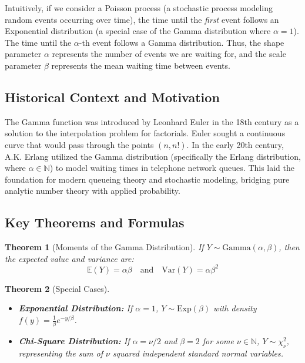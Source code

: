 \documentclass[11pt, a4paper]{article}
\newtheorem{theorem}{Theorem}[section]
\theoremstyle{definition}
\theoremstyle{remark}
\newcommand{\N}{\mathbb{N}}
\newcommand{\E}{\mathbb{E}}
\begin{document}
Intuitively, if we consider a Poisson process (a stochastic process modeling random events occurring over time), the time until the \textit{first} event follows an Exponential distribution (a special case of the Gamma distribution where $\alpha = 1$). The time until the $\alpha$-th event follows a Gamma distribution. Thus, the shape parameter $\alpha$ represents the number of events we are waiting for, and the scale parameter $\beta$ represents the mean waiting time between events.

\subsection{Historical Context and Motivation}
The Gamma function was introduced by Leonhard Euler in the 18th century as a solution to the interpolation problem for factorials. Euler sought a continuous curve that would pass through the points $(n, n!)$. In the early 20th century, A.K. Erlang utilized the Gamma distribution (specifically the Erlang distribution, where $\alpha \in \N$) to model waiting times in telephone network queues. This laid the foundation for modern queueing theory and stochastic modeling, bridging pure analytic number theory with applied probability.

\subsection{Key Theorems and Formulas}
\begin{theorem}[Moments of the Gamma Distribution]
If $Y \sim \text{Gamma}(\alpha, \beta)$, then the expected value and variance are:
\[ \E(Y) = \alpha\beta \quad \text{and} \quad \text{Var}(Y) = \alpha\beta^2 \]
\end{theorem}

\begin{theorem}[Special Cases]
\begin{itemize}
    \item \textbf{Exponential Distribution:} If $\alpha = 1$, $Y \sim \text{Exp}(\beta)$ with density $f(y) = \frac{1}{\beta}e^{-y/\beta}$.
    \item \textbf{Chi-Square Distribution:} If $\alpha = \nu/2$ and $\beta = 2$ for some $\nu \in \N$, $Y \sim \chi^2_\nu$, representing the sum of $\nu$ squared independent standard normal variables.
\end{itemize}
\end{theorem}
\end{document}
